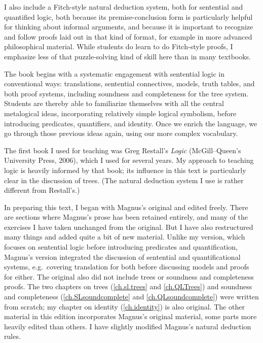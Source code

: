 I also include a Fitch-style natural deduction system, both for sentential and quantified logic, both because its premise-conclusion form is particularly helpful for thinking about informal arguments, and because it is important to recognize and follow proofs laid out in that kind of format, for example in more advanced philosophical material. While students do learn to do Fitch-style proofs, I emphasize less of that puzzle-solving kind of skill here than in many textbooks.

The book begins with a systematic engagement with sentential logic in conventional ways: translations, sentential connectives, models, truth tables, and both proof systems, including soundness and completeness for the tree system. Students are thereby able to familiarize themselves with all the central metalogical ideas, incorporating relatively simple logical symbolism, before introducing predicates, quantifiers, and identity. Once we enrich the language, we go through those previous ideas again, using our more complex vocabulary.

The first book I used for teaching was Greg Restall's \emph{Logic} (McGill--Queen's University Press, 2006), which I used for several years. My approach to teaching logic is heavily informed by that book; its influence in this text is particularly clear in the discussion of trees. (The natural deduction system I use is rather different from Restall's.)

In preparing this text, I began with Magnus's original and edited freely. There are sections where Magnus's prose has been retained entirely, and many of the exercises I have taken unchanged from the original. But I have also restructured many things and added quite a bit of new material. Unlike my version, which focuses on sentential logic before introducing predicates and quantification, Magnus's version integrated the discussion of sentential and quantificational systems, e.g.\ covering translation for both before discussing models and proofs for either. The original also did not include trees or soundness and completeness proofs. The two chapters on trees (\ref{ch.sl.trees} and \ref{ch.QLTrees}) and soundness and completeness (\ref{ch.SLsoundcomplete} and \ref{ch.QLsoundcomplete}) were written from scratch; my chapter on identity (\ref{ch.identity}) is also original. The other material in this edition incorporates Magnus's original material, some parts more heavily edited than others. I have slightly modified Magnus's natural deduction rules.

